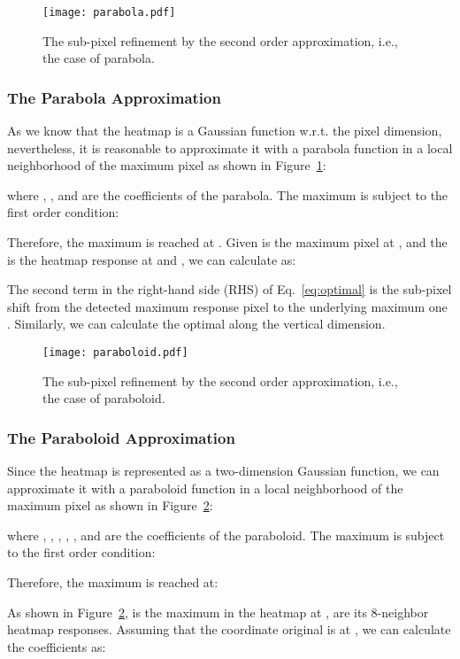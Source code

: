 \documentclass[twocolumn]{svjour3}          \smartqed  \usepackage{natbib}
\begin{document}
\begin{figure}[t]
\centering
\texttt{[image: parabola.pdf]}
\caption{The sub-pixel refinement by the second order approximation, i.e., the case of parabola.}
\label{fig:parabola}
\end{figure}

\subsubsection{The Parabola Approximation}
\label{subsec:parabola}
As we know that the heatmap is a Gaussian function w.r.t. the pixel dimension, nevertheless, it is reasonable to approximate it with a parabola function in a local neighborhood of the maximum pixel as shown in Figure~\ref{fig:parabola}:

where , , and  are the coefficients of the parabola. The maximum  is subject to the first order condition:

Therefore, the maximum  is reached at .
Given  is the maximum pixel at ,  and the  is the heatmap response at  and , we can calculate  as:

The second term in the right-hand side (RHS) of Eq.~\eqref{eq:optimal} is the sub-pixel shift from the detected maximum response pixel  to the underlying maximum one . Similarly, we can calculate the optimal  along the vertical dimension.

\begin{figure}[t]
\centering
\texttt{[image: paraboloid.pdf]}
\caption{The sub-pixel refinement by the second order approximation, i.e., the case of paraboloid.}
\label{fig:paraboloid}
\end{figure}

\subsubsection{The Paraboloid Approximation}
\label{subsec:paraboloid}
Since the heatmap is represented as a two-dimension Gaussian function, we can approximate it with a paraboloid function in a local neighborhood of the maximum pixel as shown in Figure~\ref{fig:paraboloid}:

where , , , , , and  are the coefficients of the paraboloid. The maximum  is subject to the first order condition:

Therefore, the maximum  is reached at:

As shown in Figure~\ref{fig:paraboloid},  is the maximum in the heatmap at ,  are its 8-neighbor heatmap responses. Assuming that the coordinate original is at , we can calculate the coefficients  as:
\end{document}
